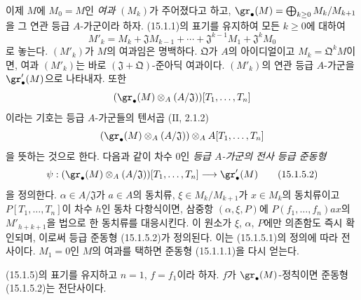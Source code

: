 \begin{env}[15.1.5]
\label{0.15.1.5-fr}
이제 $M$에 $M_0=M$인 \emph{여과} $(M_k)$가 주어졌다고 하고,
$\gr_\bullet(M)=\bigoplus_{k\geq0}M_k/M_{k+1}$을 그 연관 등급
$A$-가군이라 하자. (15.1.1)의 표기를 유지하여 모든
$k\geq0$에 대하여
\[
  M'_k=M_k+\mathfrak{J}M_{k-1}+\cdots+
  \mathfrak{J}^{k-1}M_1+\mathfrak{J}^kM_0
  \tag{15.1.5.1}\label{0.15.1.5.1-fr}
\]
로 놓는다. $(M'_k)$가 $M$의 여과임은 명백하다. $\mathfrak Q$가
$A$의 아이디얼이고 $M_k=\mathfrak{Q}^kM$이면, 여과 $(M'_k)$는 바로
$(\mathfrak{J}+\mathfrak{Q})$-준아딕 여과이다. $(M'_k)$의 연관 등급
$A$-가군을 $\gr'_\bullet(M)$으로 나타내자. 또한
\[
  (\gr_\bullet(M)\otimes_A(A/\mathfrak{J}))[T_1,\ldots,T_n]
\]
이라는 기호는 등급 $A$-가군들의 텐서곱 ($\mathrm{II}$, 2.1.2)
\[
  (\gr_\bullet(M)\otimes_A(A/\mathfrak{J}))
  \otimes_A A[T_1,\ldots,T_n]
\]
을 뜻하는 것으로 한다. 다음과 같이 차수 $0$인
\emph{등급 $A$-가군의 전사 등급 준동형}
\[
  \psi:(\gr_\bullet(M)\otimes_A(A/\mathfrak{J}))[T_1,\ldots,T_n]
  \longrightarrow\gr'_\bullet(M)
  \tag{15.1.5.2}\label{0.15.1.5.2-fr}
\]
을 정의한다. $\alpha\in A/\mathfrak{J}$가 $a\in A$의 동치류,
$\xi\in M_k/M_{k+1}$가 $x\in M_k$의 동치류이고
$P[T_1,\ldots,T_n]$이 차수 $h$인 동차 다항식이면, 삼중항
$(\alpha,\xi,P)$에 $P(f_1,\ldots,f_n)ax$의 $M'_{h+k+1}$을 법으로 한
동치류를 대응시킨다. 이 원소가 $\xi$, $\alpha$, $P$에만 의존함도
즉시 확인되며, 이로써 등급 준동형 (15.1.5.2)가 정의된다. 이는
(15.1.5.1)의 정의에 따라 전사이다. $M_1=0$인 $M$의 여과를 택하면
준동형 (15.1.1.1)을 다시 얻는다.
\end{env}

\begin{lemma}[15.1.6]
\label{0.15.1.6-fr}
(15.1.5)의 표기를 유지하고 $n=1$, $f=f_1$이라 하자. $f$가
$\gr_\bullet(M)$-정칙이면 준동형 (15.1.5.2)는 전단사이다.
\end{lemma}

